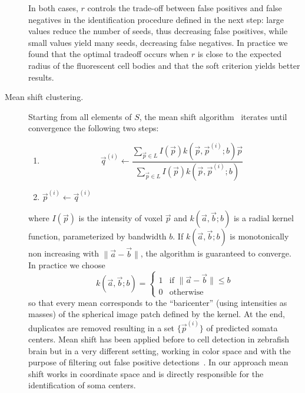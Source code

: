 \documentclass[smallextended]{svjour3}       %
\begin{document}
\begin{description}
  In both cases, $r$ controls the trade-off between false positives
  and false negatives in the identification procedure defined in the
  next step: large values reduce the number of seeds, thus decreasing
  false positives, while small values yield many seeds, decreasing
  false negatives. In practice we found that the optimal tradeoff
  occurs when $r$ is close to the expected radius of the fluorescent
  cell bodies and that the soft criterion yields better results.
\item[Mean shift clustering.] Starting from all elements of $S$, the
  mean shift algorithm~\cite{comaniciu_mean_2002} iterates until
  convergence the following two steps:
  \begin{enumerate}
  \item 
    $$
    \vec{q}^{(i)} \leftarrow \frac{\sum_{\vec{p}\in L} I(\vec{p}) k(\vec{p},\vec{p}^{(i)};b) \vec{p}}{\sum_{\vec{p}\in L} I(\vec{p})k(\vec{p},\vec{p}^{(i)};b)}
    $$ %
  \item $\vec{p}^{(i)} \leftarrow \vec{q}^{(i)}$
  \end{enumerate}
  where $I(\vec{p})$ is the intensity of voxel $\vec{p}$ and
  $k(\vec{a},\vec{b};b)$ is a radial kernel function, parameterized by
  bandwidth $b$. If $k(\vec{a},\vec{b};b)$ is monotonically non
  increasing with $\|\vec{a}-\vec{b}\|$, the algorithm is guaranteed
  to converge. In practice we choose
  \begin{equation}
    \label{eq:kernel}
  k(\vec{a},\vec{b};b) = \left\{
    \begin{array}{ll}
      1 & \mbox{if $\|\vec{a}-\vec{b}\| \leq b$}\\
      0 & \mbox{otherwise}
    \end{array}
    \right.
  \end{equation}
  so that every mean corresponds to the ``baricenter'' (using
  intensities as masses) of the spherical image patch defined by the
  kernel.  At the end, duplicates are removed resulting in a set
  $\{\vec{p}^{(i)}\}$ of predicted somata centers.  Mean shift has
  been applied before to cell detection in zebrafish brain but in a
  very different setting, working in color space and with the purpose
  of filtering out false positive
  detections~\cite{liu_automated_2008}. In our approach mean shift
  works in coordinate space and is directly responsible for the
  identification of soma centers.
\end{description}
\end{document}
